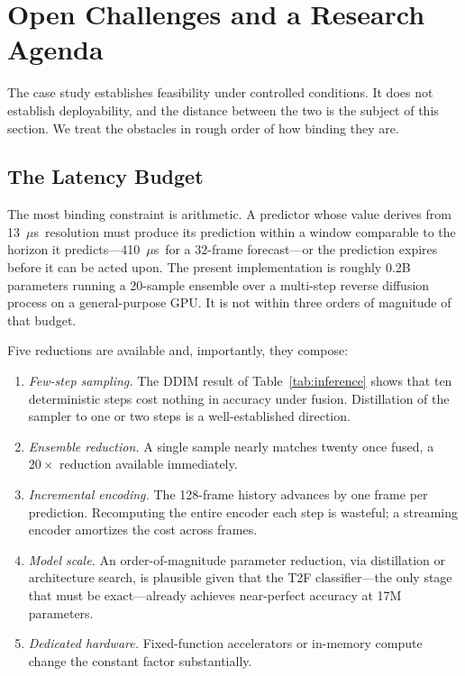 \documentclass[lettersize,journal]{IEEEtran}
\newcommand{\us}{\ensuremath{\mu}s}
\begin{document}
\section{Open Challenges and a Research Agenda}

The case study establishes feasibility under controlled conditions. It
does not establish deployability, and the distance between the two is the
subject of this section. We treat the obstacles in rough order of how
binding they are.

\subsection{The Latency Budget}
The most binding constraint is arithmetic. A predictor whose value
derives from 13~\us\ resolution must produce its prediction within a
window comparable to the horizon it predicts---410~\us\ for a 32-frame
forecast---or the prediction expires before it can be acted upon. The
present implementation is roughly 0.2B parameters running a 20-sample
ensemble over a multi-step reverse diffusion process on a
general-purpose GPU. It is not within three orders of magnitude of that
budget.

Five reductions are available and, importantly, they compose:

\begin{enumerate}
\item \emph{Few-step sampling.} The DDIM result of
Table~\ref{tab:inference} shows that ten deterministic steps cost
nothing in accuracy under fusion. Distillation of the sampler to one or
two steps is a well-established direction.
\item \emph{Ensemble reduction.} A single sample nearly matches twenty
once fused, a $20\times$ reduction available immediately.
\item \emph{Incremental encoding.} The 128-frame history advances by one
frame per prediction. Recomputing the entire encoder each step is
wasteful; a streaming encoder amortizes the cost across frames.
\item \emph{Model scale.} An order-of-magnitude parameter reduction, via
distillation \cite{Hinton2015,Cheng2023} or architecture search, is
plausible given that the T2F classifier---the only stage that must be
exact---already achieves near-perfect accuracy at 17M parameters.
\item \emph{Dedicated hardware.} Fixed-function accelerators or
in-memory compute change the constant factor substantially.
\end{enumerate}
\end{document}
